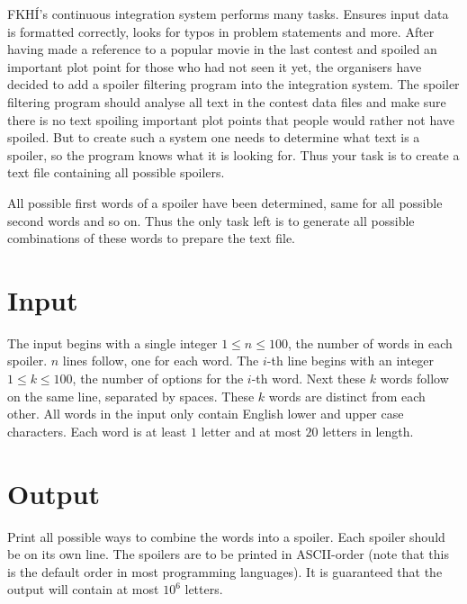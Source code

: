 
FKHÍ's continuous integration system performs many tasks.
Ensures input data is formatted correctly,
looks for typos in problem statements and more.
After having made a reference to a popular movie in the
last contest and spoiled an important plot point for those
who had not seen it yet, the organisers have decided to
add a spoiler filtering program into the integration system.
The spoiler filtering program should analyse all text in
the contest data files and make sure there is no text
spoiling important plot points that people would rather
not have spoiled. But to create such a system one needs
to determine what text is a spoiler, so the program knows
what it is looking for. Thus your task is to create a text
file containing all possible spoilers.

All possible first words of a spoiler have been determined,
same for all possible second words and so on.
Thus the only task left is to generate all possible 
combinations of these words to prepare the text file.

\section*{Input}

The input begins with a single integer $1 \leq n \leq 100$,
the number of words in each spoiler.
$n$ lines follow, one for each word.
The $i$-th line begins with an integer $1 \leq k \leq 100$,
the number of options for the $i$-th word.
Next these $k$ words follow on the same line, separated by
spaces. These $k$ words are distinct from each other.
All words in the input only contain English lower and upper
case characters.
Each word is at least $1$ letter and at most $20$ letters
in length.

\section*{Output}

Print all possible ways to combine the words into a spoiler.
Each spoiler should be on its own line.
The spoilers are to be printed in ASCII-order (note that this
is the default order in most programming languages).
It is guaranteed that the output will contain at most
$10^6$ letters.
